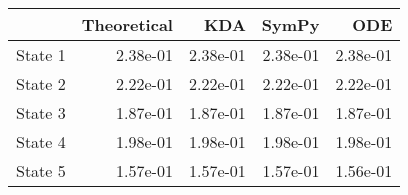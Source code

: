\begin{tabular}{lrrrr}
\toprule
{} &  Theoretical &      KDA &    SymPy &      ODE \\
\midrule
State 1 &     2.38e-01 & 2.38e-01 & 2.38e-01 & 2.38e-01 \\
State 2 &     2.22e-01 & 2.22e-01 & 2.22e-01 & 2.22e-01 \\
State 3 &     1.87e-01 & 1.87e-01 & 1.87e-01 & 1.87e-01 \\
State 4 &     1.98e-01 & 1.98e-01 & 1.98e-01 & 1.98e-01 \\
State 5 &     1.57e-01 & 1.57e-01 & 1.57e-01 & 1.56e-01 \\
\bottomrule
\end{tabular}
